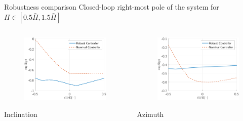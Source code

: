 \documentclass{beamer}
\begin{document}
\begin{frame}{Robustness comparison}
	Closed-loop right-most pole of the system for $\Pi \in [0.5\bar{\Pi},1.5\bar{\Pi}]$
		\begin{columns}[T]
			\hspace{0.5cm}\begin{column}{0.44\textwidth}
				\begin{figure}[ht]\centering
					\includegraphics[width=1\textwidth]{images/RobustTestComparisonInclination.pdf}
				\end{figure}
				\centering\LARGE Inclination
			\end{column}
			\hspace{0.5cm}\begin{column}{0.44\textwidth}
				\begin{figure}[ht]\centering
					\includegraphics[width=1\textwidth]{images/RobustTestComparisonAzimuth.pdf}
				\end{figure}	
			\centering	\LARGE Azimuth		
			\end{column}
		\end{columns}	
\end{frame}
\end{document}
